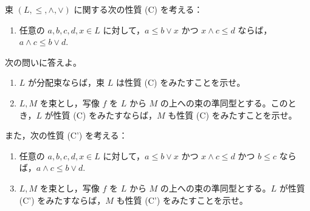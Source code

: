 \documentclass[12pt]{jlreq}
\begin{document}
束 $(L, \le, \wedge, \vee)$ に関する次の性質 (C) を考える：
\begin{enumerate}
  \item[(C)] 任意の $a, b, c, d, x \in L$ に対して，$a \le b \vee x$ かつ $x \wedge c \le d$ ならば，$a \wedge c \le b \vee d$.
\end{enumerate}
次の問いに答えよ。

\begin{enumerate}
  \item $L$ が分配束ならば，束 $L$ は性質 (C) をみたすことを示せ。
  \item $L, M$ を束とし，写像 $f$ を $L$ から $M$ の上への束の準同型とする。このとき，$L$ が性質 (C) をみたすならば，$M$ も性質 (C) をみたすことを示せ。
\end{enumerate}
また，次の性質 (C') を考える：
\begin{enumerate}
  \item[(C')] 任意の $a, b, c, d, x \in L$ に対して，$a \le b \vee x$ かつ $x \wedge c \le d$ かつ $b \le c$ ならば，$a \wedge c \le b \vee d$.
\end{enumerate}

\begin{enumerate}
  \setcounter{enumi}{2}
  \item $L, M$ を束とし，写像 $f$ を $L$ から $M$ の上への束の準同型とする。$L$ が性質 (C') をみたすならば，$M$ も性質 (C') をみたすことを示せ。
\end{enumerate}
\end{document}
